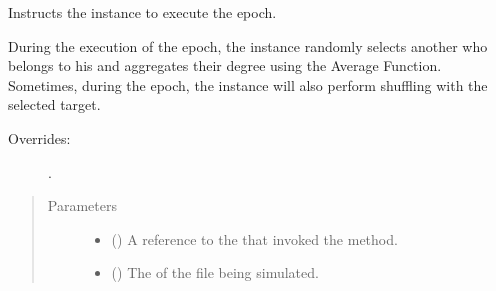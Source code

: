 \documentclass[letterpaper,10pt,english]{sphinxmanual}
\begin{document}
\begin{fulllineitems}
\begin{fulllineitems}
\label{\detokenize{app.domain:app.domain.network_nodes.NewscastNode.execute_epoch}}
Instructs the  instance to execute the epoch.

During the execution of the epoch, the 
instance randomly selects another  who belongs to his
{\hyperref[\detokenize{app.domain:app.domain.network_nodes.NewscastNode.view}]{}} and aggregates their degree using the Average
Function. Sometimes, during the epoch, the  instance
will also perform shuffling with the selected target.
\begin{description}
\item[{Overrides:}] \leavevmode
{\hyperref[\detokenize{app.domain:app.domain.network_nodes.Node.execute_epoch}]{}}.

\end{description}
\begin{quote}\begin{description}
\item[{Parameters}] \leavevmode\begin{itemize}
\item {} 
 ({\hyperref[\detokenize{app:app.type_hints.ClusterType}]{}}) \textendash{} A reference to the
{\hyperref[\detokenize{app.domain:app.domain.cluster_groups.Cluster}]{}} that invoked
the  method.

\item {} 
 () \textendash{} The {\hyperref[\detokenize{app.domain.helpers:app.domain.helpers.smart_dataclasses.FileData.name}]{}}
of the file being simulated.

\end{itemize}


\end{description}
\end{quote}
\end{fulllineitems}
\end{fulllineitems}
\end{document}
